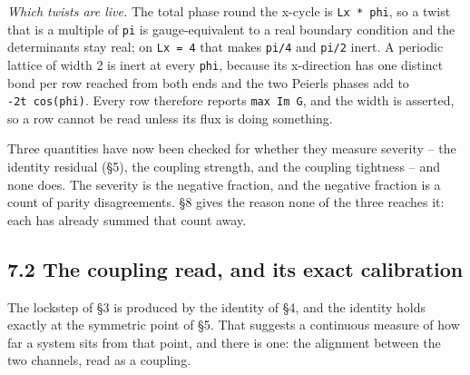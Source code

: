 \documentclass[10pt,letterpaper,twocolumn]{article}
\begin{document}
\emph{Which twists are live.} The total phase round the x-cycle is \texttt{Lx\ *\allowbreak{}\ phi}, so a twist that is a
multiple of \texttt{pi} is gauge-equivalent to a real boundary condition and the determinants stay real;
on \texttt{Lx\ =\allowbreak{}\ 4} that makes \texttt{pi/\allowbreak{}4} and \texttt{pi/\allowbreak{}2} inert. A periodic lattice of width 2 is inert at every
\texttt{phi}, because its x-direction has one distinct bond per row reached from both ends and the two
Peierls phases add to \texttt{-{}\allowbreak{}2t\ cos(\allowbreak{}phi)\allowbreak{}}. Every row therefore reports \texttt{max\ \textbar{}\allowbreak{}Im\ G\textbar{}\allowbreak{}}, and the width is
asserted, so a row cannot be read unless its flux is doing something.

Three quantities have now been checked for whether they measure severity -- the identity residual
(§5), the coupling strength, and the coupling tightness -- and none does. The severity is the
negative fraction, and the negative fraction is a count of parity disagreements. §8 gives the
reason none of the three reaches it: each has already summed that count away.

\subsection{7.2 The coupling read, and its exact calibration}\label{72-the-coupling-read-and-its-exact-calibration}

The lockstep of §3 is produced by the identity of §4, and the identity holds exactly at the
symmetric point of §5. That suggests a continuous measure of how far a system sits from that
point, and there is one: the alignment between the two channels, read as a coupling.
\end{document}
